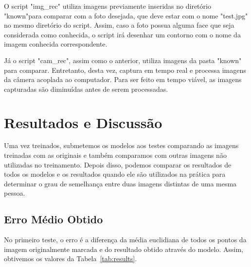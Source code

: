 \documentclass[twoside,conference,a4paper]{IEEEtran}
\begin{document}
O script "img\_rec" utiliza imagens previamente inseridas no diretório "known"para comparar com a foto desejada, que deve estar com o nome "test.jpg" no mesmo diretório do script. Assim, caso a foto possua alguma face que seja considerada como conhecida, o script irá desenhar um contorno com o nome da imagem conhecida correspondente.

Já o script "cam\_rec", assim como o anterior, utiliza imagens da pasta "known" para comparar. Entretanto, desta vez, captura em tempo real e processa imagens da câmera acoplada ao computador. Para ser feito em tempo viável, as imagens capturadas são diminuídas antes de serem processadas.

\section{Resultados e Discussão}
Uma vez treinados, submetemos os modelos aos testes comparando as imagens treinadas com as originais e também comparamos com outras imagens não utilizadas no treinamento. Depois disso, podemos comparar os resultados de todos os modelos e os resultados quando ele são utilizados na prática para determinar o grau de semelhança entre duas imagens distintas de uma mesma pessoa. 
\subsection{Erro Médio Obtido}
No primeiro teste, o erro é a diferença da média euclidiana de todos os pontos da imagem originalmente marcada e do resultado obtido através do modelo. Assim, obtivemos os valores da Tabela~\ref{tab:results}.
\end{document}
